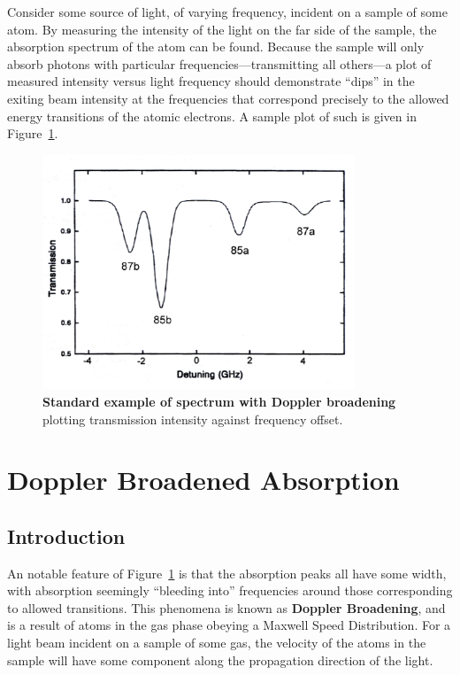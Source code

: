 \documentclass[paper=a4, fontsize=11pt]{scrartcl} %
\numberwithin{equation}{section}
\numberwithin{figure}{section}
\numberwithin{table}{section}
\begin{document}
Consider some source
of light, of varying frequency, incident on a sample of some atom. By measuring the intensity of the light on the far side of the sample, the absorption spectrum of the atom can be found. Because the sample will only absorb photons with particular frequencies---transmitting all others---a plot of measured intensity versus light frequency should demonstrate ``dips'' in the exiting beam intensity at the frequencies that correspond precisely
to the allowed energy transitions of the atomic electrons. A sample plot of such is given in Figure~\ref{fig:broadening}. 

\begin{figure}[h] \begin{center}
  \includegraphics[height=70mm]{broadening.png}
  \caption{\textbf{Standard example of spectrum with Doppler broadening} plotting transmission intensity against  frequency offset.\cite{caltech}}
  \label{fig:broadening}
\end{center} \end{figure}


\section{Doppler Broadened Absorption}
\label{sec:broad}

\subsection{Introduction}

An notable feature of Figure~\ref{fig:broadening} is that the
absorption peaks all have some width, with absorption seemingly ``bleeding into''
frequencies around those corresponding to allowed transitions. This
phenomena is known as \textbf{Doppler Broadening}, and is a result of atoms in
the gas phase obeying a Maxwell Speed Distribution. For a light beam incident
on a sample of some gas, the velocity of the atoms in the sample will
have some component along the propagation direction of the light.
\end{document}
